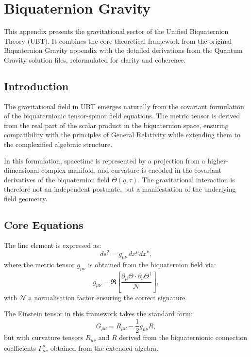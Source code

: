 \section{Biquaternion Gravity}

This appendix presents the gravitational sector of the Unified Biquaternion Theory (UBT).
It combines the core theoretical framework from the original Biquaternion Gravity appendix
with the detailed derivations from the Quantum Gravity solution files, reformulated for
clarity and coherence.

\subsection{Introduction}

The gravitational field in UBT emerges naturally from the covariant formulation of the
biquaternionic tensor-spinor field equations. The metric tensor is derived from the real
part of the scalar product in the biquaternion space, ensuring compatibility with the
principles of General Relativity while extending them to the complexified algebraic
structure.

In this formulation, spacetime is represented by a projection from a higher-dimensional
complex manifold, and curvature is encoded in the covariant derivatives of the
biquaternion field $\Theta(q,\tau)$. The gravitational interaction is therefore not an
independent postulate, but a manifestation of the underlying field geometry.

\subsection{Core Equations}

The line element is expressed as:
\begin{equation}
  ds^2 = g_{\mu\nu} \, dx^\mu dx^\nu ,
\end{equation}
where the metric tensor $g_{\mu\nu}$ is obtained from the biquaternion field via:
\begin{equation}
  g_{\mu\nu} = \Re\left[ \frac{\partial_\mu \Theta \cdot \partial_\nu \Theta^\dagger}{\mathcal{N}} \right],
\end{equation}
with $\mathcal{N}$ a normalisation factor ensuring the correct signature.

The Einstein tensor in this framework takes the standard form:
\begin{equation}
  G_{\mu\nu} = R_{\mu\nu} - \frac{1}{2} g_{\mu\nu} R ,
\end{equation}
but with curvature tensors $R_{\mu\nu}$ and $R$ derived from the biquaternionic connection
coefficients $\Gamma^\rho_{\mu\nu}$ obtained from the extended algebra.


